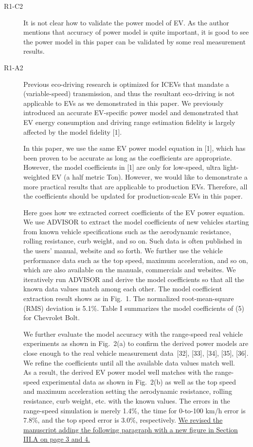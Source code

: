 \documentclass[onecolumn]{IEEEconf}
\begin{document}
\begin{description}
\item [R1-C2] It is not clear how to validate the power model of EV. As the author mentions that accuracy of power model is quite important, it is good to see the power model in this paper can be validated by some real measurement results.

\item [R1-A2] Previous eco-driving research is optimized for ICEVs that mandate a (variable-speed) transmission, and thus the resultant eco-driving is not applicable to EVs as we demonstrated in this paper. We previously introduced an accurate EV-specific power model and demonstrated that  EV energy consumption and driving range estimation fidelity is largely affected by the model fidelity [1]. 

In this paper, we use the same EV power model equation in [1], which has been proven to be accurate as long as the coefficients are appropriate. However, the model coefficients in [1] are only for low-speed, ultra light-weighted EV (a half metric Ton). However, we would like to demonstrate a more practical results that are applicable to production EVs. Therefore, all the coefficients should be updated for production-scale EVs in this paper. 

Here goes how we extracted correct coefficients of the EV power equation. We use ADVISOR to extract the model coefficients of new vehicles starting from known vehicle specifications such as the aerodynamic resistance, rolling resistance, curb weight, and so on. Such data is often published in the users' manual, website and so forth. We further use the vehicle performance data such as the top speed, maximum acceleration, and so on, which are also available on the manuals, commercials and websites. We iteratively run ADVISOR and derive the model coefficients so that all the known data values match among each other.
The model coefficient extraction result shows as in Fig.~1. The normalized root-mean-square (RMS) deviation is 5.1\%. Table I summarizes the model coefficients of (5) for Chevrolet Bolt.

We further evaluate the model accuracy with the range-speed real vehicle experiments as shown in Fig.~2(a) to confirm the derived power models are close enough to the real vehicle measurement data~[32], [33], [34], [35], [36]. We  refine the coefficients until all the available data values match well. \\
As a result, the derived EV power model well matches with the range-speed experimental data as shown in Fig.~2(b) as well as the top speed and maximum acceleration setting the aerodynamic resistance, rolling resistance, curb weight, etc. with the known values. The errors in the range-speed simulation is merely 1.4\%, the time for 0-to-100 km/h error is 7.8\%, and the top speed error is 3.0\%, respectively. 
\uline{We revised the manuscript adding the following paragraph with a new figure in Section III.A on page 3 and 4.} \\


\end{description}
\end{document}
